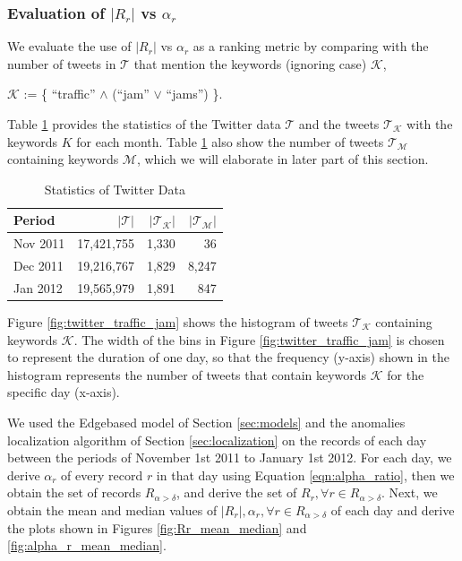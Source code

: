 \documentclass[conference]{IEEEtran.1.8}
\begin{document}
\subsubsection{Evaluation of $|R_r|$ vs $\alpha_r$}

We evaluate the use of $|R_r|$ vs $\alpha_r$ as a ranking metric by comparing with the number of tweets in $\mathcal{T}$ that mention the keywords (ignoring case) $\mathcal{K}$, 
\begin{center}
	$\mathcal{K}$ := \{ ``traffic'' $\land$ (``jam'' $\lor$ ``jams'') \}.
\end{center}
Table \ref{tbl:twitter} provides the statistics of the Twitter data $\mathcal{T}$ and the tweets $\mathcal{T}_{\mathcal{K}}$ with the keywords $K$ for each month. Table \ref{tbl:twitter} also show the number of tweets $\mathcal{T}_{\mathcal{M}}$ containing keywords $\mathcal{M}$, which we will elaborate in later part of this section.
\begin{table}[htb]
	\centering
	\caption{Statistics of Twitter Data}
	\label{tbl:twitter}
	\begin{tabular}{|l|r|r|r|}
		\hline
			Period & $| \mathcal{T} |$ & $| \mathcal{T}_{\mathcal{K}} |$ & $| \mathcal{T}_{\mathcal{M}} |$ \\
		\hline
			Nov 2011 & 17,421,755 & 1,330 & 36 \\
		\hline
			Dec 2011 & 19,216,767 & 1,829 & 8,247 \\
		\hline
			Jan 2012 &  19,565,979 & 1,891 & 847 \\
		\hline
	\end{tabular}	
\end{table}

Figure \ref{fig:twitter_traffic_jam} shows the histogram of tweets $\mathcal{T}_{\mathcal{K}}$ containing keywords $\mathcal{K}$. The width of the bins in Figure \ref{fig:twitter_traffic_jam} is chosen to represent the duration of one day, so that the frequency (y-axis) shown in the histogram represents the number of tweets that contain keywords $\mathcal{K}$ for the specific day (x-axis).

We used the Edgebased model of Section \ref{sec:models} and the anomalies localization algorithm of Section \ref{sec:localization} on the records of each day between the periods of November 1st 2011 to January 1st 2012. For each day, we derive $\alpha_r$ of every record $r$ in that day using Equation \ref{eqn:alpha_ratio}, then we obtain the set of records $R_{\alpha > \delta}$, and derive the set of $R_r, \forall r \in R_{\alpha > \delta}$. Next, we obtain the mean and median values of $|R_r|, \alpha_r, \forall r \in R_{\alpha > \delta}$ of each day and derive the plots shown in Figures \ref{fig:Rr_mean_median} and \ref{fig:alpha_r_mean_median}. 
\end{document}
